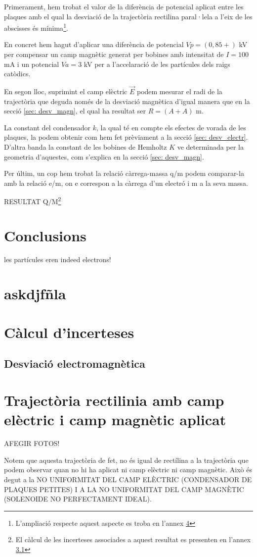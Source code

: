 \documentclass[11pt]{article}
\begin{document}
Primerament, hem trobat el valor de la diferència de potencial aplicat entre les plaques amb el qual la desviació de la trajectòria rectilina paral·lela a l'eix de les abscisses és mínima\footnote{L'ampliació respecte aquest aspecte es troba en l'annex \ref{sec: traj_no_rect}}. 

En concret hem hagut d'aplicar una diferència de potencial $Vp = (0,85 + )$ kV per compensar un camp magnètic generat per bobines amb intensitat de $I = 100$ mA i un potencial $Va = 3$ kV per a l'accelaració de les partícules dels raigs catòdics.

En segon lloc, suprimint el camp elèctric $\vec{E}$ podem mesurar el radi de la trajectòria que deguda només de la desviació magnètica d'igual manera que en la secció \ref{sec: desv_magn}, el qual ha resultat ser $R = (A + A)$ m.

La constant del condensador $k$, la qual té en compte els efectes de vorada de les plaques, la podem obtenir com hem fet prèviament a la secció \ref{sec: desv_electr}. D'altra banda la constant de les bobines de Hemholtz $K$ ve determinada per la geometria d'aquestes, com s'explica en la secció \ref{sec: desv_magn}.

Per últim, un cop hem trobat la relació càrrega-massa q/m podem comparar-la amb la relació e/m, on e correspon a la càrrega d'un electró i m a la seva massa.

RESULTAT Q/M\footnote{El càlcul de les incerteses associades a aquest resultat es presenten en l'annex \ref{sec: inc_desv_em}}

\section{Conclusions}
les partícules eren indeed electrons!

\section{askdjfñla}

\section{Càlcul d'incerteses}\label{sec: incerteses}
\subsection{Desviació electromagnètica}\label{sec: inc_desv_em}

\section{Trajectòria rectilinia amb camp elèctric i camp magnètic aplicat}\label{sec: traj_no_rect}

AFEGIR FOTOS!

Notem que aquesta trajectòria de fet, no és igual de rectílina a la trajectòria que podem observar quan no hi ha aplicat ni camp elèctric ni camp magnètic. Això és degut a la NO UNIFORMITAT DEL CAMP ELÈCTRIC (CONDENSADOR DE PLAQUES PETITES) I A LA NO UNIFORMITAT DEL CAMP MAGNÈTIC (SOLENOIDE NO PERFECTAMENT IDEAL).
\end{document}
